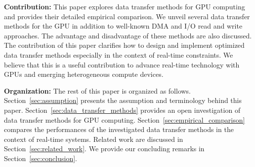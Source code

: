 \textbf{Contribution:}
This paper explores data transfer methods for GPU computing and
provides their detailed empirical comparison.
We unveil several data transfer methods for the GPU in addition to
well-known DMA and I/O read and write approaches.
The advantage and disadvantage of these methods are also discussed.
The contribution of this paper clarifies how to design and implement
optimized data transfer methods especially in the context of real-time
constraints.
We believe that this is a useful contribution to advance real-time
technology with GPUs and emerging heterogeneous compute devices.

\textbf{Organization:}
The rest of this paper is organized as follows.
Section~\ref{sec:assumption} presents the assumption and terminology
behind this paper.
Section~\ref{sec:data_transfer_methods} provides an open investigation
of data transfer methods for GPU computing.
Section~\ref{sec:empirical_comparison} compares the performances of the
investigated data transfer methods in the context of real-time systems.
Related work are discussed in Section~\ref{sec:related_work}.
We provide our concluding remarks in Section~\ref{sec:conclusion}.

